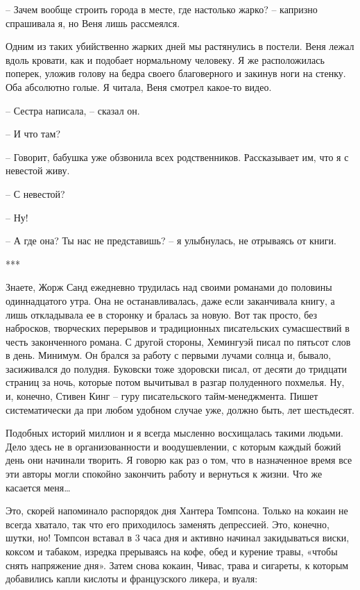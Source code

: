 \documentclass[
]{book}
\begin{document}
-- Зачем вообще строить города в месте, где настолько жарко? -- капризно спрашивала я, но Веня лишь рассмеялся.

Одним из таких убийственно жарких дней мы растянулись в постели. Веня лежал вдоль кровати, как и подобает нормальному человеку. Я же расположилась поперек, уложив голову на бедра своего благоверного и закинув ноги на стенку. Оба абсолютно голые. Я читала, Веня смотрел какое-то видео.

-- Сестра написала, -- сказал он.

-- И что там?

-- Говорит, бабушка уже обзвонила всех родственников. Рассказывает им, что я с невестой живу.

-- С невестой?

-- Ну!

-- А где она? Ты нас не представишь? -- я улыбнулась, не отрываясь от книги.

***

Знаете, Жорж Санд ежедневно трудилась над своими романами до половины одиннадцатого утра. Она не останавливалась, даже если заканчивала книгу, а лишь откладывала ее в сторонку и бралась за новую. Вот так просто, без набросков, творческих перерывов и традиционных писательских сумасшествий в честь законченного романа. С другой стороны, Хемингуэй писал по пятьсот слов в день. Минимум. Он брался за работу с первыми лучами солнца и, бывало, засиживался до полудня. Буковски тоже здоровски писал, от десяти до тридцати страниц за ночь, которые потом вычитывал в разгар полуденного похмелья. Ну, и, конечно, Стивен Кинг -- гуру писательского тайм-менеджмента. Пишет систематически да при любом удобном случае уже, должно быть, лет шестьдесят.

Подобных историй миллион и я всегда мысленно восхищалась такими людьми. Дело здесь не в организованности и воодушевлении, с которым каждый божий день они начинали творить. Я говорю как раз о том, что в назначенное время все эти авторы могли спокойно закончить работу и вернуться к жизни. Что же касается меня\ldots{}

Это, скорей напоминало распорядок дня Хантера Томпсона. Только на кокаин не всегда хватало, так что его приходилось заменять депрессией. Это, конечно, шутки, но! Томпсон вставал в 3 часа дня и активно начинал закидываться виски, коксом и табаком, изредка прерываясь на кофе, обед и курение травы, «чтобы снять напряжение дня». Затем снова кокаин, Чивас, трава и сигареты, к которым добавились капли кислоты и французского ликера, и вуаля:
\end{document}
